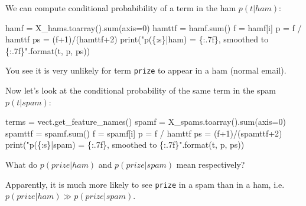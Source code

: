 \documentclass[
  letterpaper,
]{scrbook}
\newenvironment{Shaded}{\begin{snugshade}}{\end{snugshade}}
\newcommand{\BuiltInTok}[1]{\textcolor[rgb]{0.00,0.23,0.31}{#1}}
\newcommand{\DecValTok}[1]{\textcolor[rgb]{0.68,0.00,0.00}{#1}}
\newcommand{\NormalTok}[1]{\textcolor[rgb]{0.00,0.23,0.31}{#1}}
\newcommand{\OperatorTok}[1]{\textcolor[rgb]{0.37,0.37,0.37}{#1}}
\newcommand{\SpecialCharTok}[1]{\textcolor[rgb]{0.37,0.37,0.37}{#1}}
\newcommand{\StringTok}[1]{\textcolor[rgb]{0.13,0.47,0.30}{#1}}
\begin{document}
We can compute conditional probabibility of a term in the ham
\(p(t|ham)\):

\begin{Shaded}
\begin{Highlighting}[]
\NormalTok{hamf }\OperatorTok{=}\NormalTok{ X\_hams.toarray().}\BuiltInTok{sum}\NormalTok{(axis}\OperatorTok{=}\DecValTok{0}\NormalTok{)}
\NormalTok{hamttf }\OperatorTok{=}\NormalTok{ hamf.}\BuiltInTok{sum}\NormalTok{()}
\NormalTok{f }\OperatorTok{=}\NormalTok{ hamf[i]}
\NormalTok{p }\OperatorTok{=}\NormalTok{ f }\OperatorTok{/}\NormalTok{ hamttf}
\NormalTok{ps }\OperatorTok{=}\NormalTok{ (f}\OperatorTok{+}\DecValTok{1}\NormalTok{)}\OperatorTok{/}\NormalTok{(hamttf}\OperatorTok{+}\DecValTok{2}\NormalTok{)}
\BuiltInTok{print}\NormalTok{(}\StringTok{"p(}\SpecialCharTok{\{:s\}}\StringTok{|ham) = }\SpecialCharTok{\{:.7f\}}\StringTok{, smoothed to }\SpecialCharTok{\{:.7f\}}\StringTok{"}\NormalTok{.}\BuiltInTok{format}\NormalTok{(t, p, ps))}
\end{Highlighting}
\end{Shaded}

You see it is very unlikely for term \texttt{prize} to appear in a ham
(normal email).

Now let's look at the conditional probability of the same term in the
spam \(p(t|spam)\):

\begin{Shaded}
\begin{Highlighting}[]
\NormalTok{terms }\OperatorTok{=}\NormalTok{ vect.get\_feature\_names()}
\NormalTok{spamf }\OperatorTok{=}\NormalTok{ X\_spams.toarray().}\BuiltInTok{sum}\NormalTok{(axis}\OperatorTok{=}\DecValTok{0}\NormalTok{)}
\NormalTok{spamttf }\OperatorTok{=}\NormalTok{ spamf.}\BuiltInTok{sum}\NormalTok{()}
\NormalTok{f }\OperatorTok{=}\NormalTok{ spamf[i]}
\NormalTok{p }\OperatorTok{=}\NormalTok{ f }\OperatorTok{/}\NormalTok{ hamttf}
\NormalTok{ps }\OperatorTok{=}\NormalTok{ (f}\OperatorTok{+}\DecValTok{1}\NormalTok{)}\OperatorTok{/}\NormalTok{(spamttf}\OperatorTok{+}\DecValTok{2}\NormalTok{)}
\BuiltInTok{print}\NormalTok{(}\StringTok{"p(}\SpecialCharTok{\{:s\}}\StringTok{|spam) = }\SpecialCharTok{\{:.7f\}}\StringTok{, smoothed to }\SpecialCharTok{\{:.7f\}}\StringTok{"}\NormalTok{.}\BuiltInTok{format}\NormalTok{(t, p, ps))}
\end{Highlighting}
\end{Shaded}

What do \(p(prize|ham)\) and \(p(prize|spam)\) mean respectively?

Apparently, it is much more likely to see \texttt{prize} in a spam than
in a ham, i.e.~\(p(prize|ham) \gg p(prize|spam)\).
\end{document}

